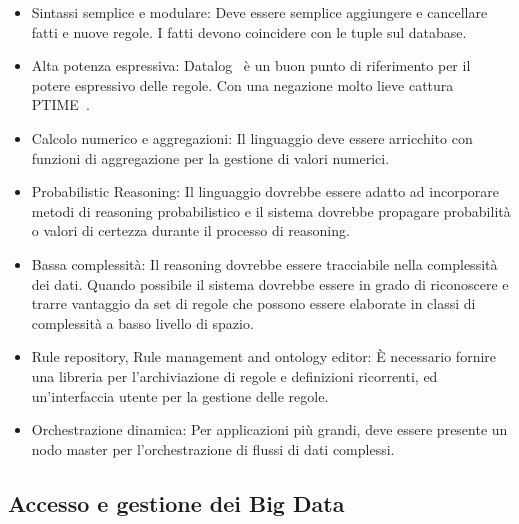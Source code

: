 \begin{itemize}
	\item Sintassi semplice e modulare: Deve essere semplice aggiungere e cancellare fatti e nuove regole. I fatti devono coincidere con le tuple sul database.
	\item Alta potenza espressiva: Datalog~\cite{ceri2012logic, huang2011datalog} è un buon punto di riferimento per il potere espressivo delle regole. Con una negazione molto lieve cattura PTIME~\cite{dantsin2001complexity}.
	\item Calcolo numerico e aggregazioni: Il linguaggio deve essere arricchito con funzioni di aggregazione per la gestione di valori numerici.
	\item Probabilistic Reasoning: Il linguaggio dovrebbe essere adatto ad incorporare metodi di reasoning probabilistico e il sistema dovrebbe propagare probabilità o valori di certezza durante il processo di reasoning.
	\item Bassa complessità: Il reasoning dovrebbe essere tracciabile nella complessità dei dati. Quando possibile il sistema dovrebbe essere in grado di riconoscere e trarre vantaggio da set di regole che possono essere elaborate in classi di complessità a basso livello di spazio. 
	\item Rule repository, Rule management and ontology editor: È necessario fornire una libreria per l'archiviazione di regole e definizioni ricorrenti, ed un'interfaccia utente per la gestione delle regole.
	\item Orchestrazione dinamica: Per applicazioni più grandi, deve essere presente un nodo master per l'orchestrazione di flussi di dati complessi.
\end{itemize}

\subsection{Accesso e gestione dei Big Data}


